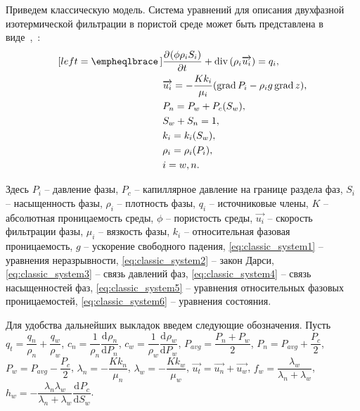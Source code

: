 \newcommand*{\pd}[3][]{\ensuremath{\dfrac{\partial^{#1} #2}{\partial #3^{#1}}}}
\newcommand*{\dd}[3][]{\ensuremath{\dfrac{\mathrm d^{#1} #2}{\mathrm d #3^{#1}}}}
\newcommand{\grad}{\mathop{\mathrm{grad}}\nolimits}
\newcommand{\diver}{\mathop{\mathrm{div}}\nolimits}

Приведем классическую модель. Система уравнений для описания двухфазной изотермической фильтрации в пористой среде
может быть представлена в виде~\cite{Aziz-Settari},~\cite{Basniev}:
\begin{subequations} \label{eq:classic_system}
  \begin{align}[left = \empheqlbrace\,]
    &\pd {(\phi \rho_i S_i)}{t} + \diver{(\rho_i \overrightarrow{u_i})} = q_i, \label{eq:classic_system1} \\
    &\overrightarrow{u_i} = -\frac{K k_i}{\mu_i}(\grad {P_i} - {\rho}_i g \grad {z}), \label{eq:classic_system2} \\
    &P_n = P_w + P_{c}({S}_w), \label{eq:classic_system3} \\
    &S_w + S_n = 1, \label{eq:classic_system4} \\
    &k_i = k_i({S}_w), \label{eq:classic_system5} \\
    &\rho_i = \rho_i(P_i), \label{eq:classic_system6} \\
    &i = w,n \nonumber .
  \end{align}
\end{subequations}

Здесь 
$P_i$ -- давление фазы,
$P_c$ -- капиллярное давление на границе раздела фаз,
$S_i$ -- насыщенность фазы,
${\rho}_i$ -- плотность фазы,
$q_i$ -- источниковые члены,
$K$ -- абсолютная проницаемость среды,
$\phi$ -- пористость среды,
$\overrightarrow{u_i}$ -- скорость фильтрации фазы,
$\mu_i$ -- вязкость фазы,
$k_i$ -- относительная фазовая проницаемость,
$g$ -- ускорение свободного падения,
\eqref{eq:classic_system1} -- уравнения неразрывности,
\eqref{eq:classic_system2} -- закон Дарси,
\eqref{eq:classic_system3} -- связь давлений фаз,
\eqref{eq:classic_system4} -- связь насыщенностей фаз,
\eqref{eq:classic_system5} -- уравнения относительных фазовых проницаемостей,
\eqref{eq:classic_system6} -- уравнения состояния.

Для удобства дальнейших выкладок введем следующие обозначения.
Пусть $q_t = \dfrac{q_n}{\rho_n} + \dfrac{q_w}{\rho_w}$,
$c_n = \dfrac{1}{\rho_n} \dd{\rho_n}{P_n}$,
$c_w = \dfrac{1}{\rho_w} \dd{\rho_w}{P_w}$,
$P_{avg} = \dfrac{P_n + P_w}{2}$,
$P_n = P_{avg} + \dfrac{P_c}{2}$,
$P_w = P_{avg} - \dfrac{P_c}{2}$,
$\lambda_n = -\dfrac{K k_n}{\mu_n}$,
$\lambda_w = -\dfrac{K k_w}{\mu_w}$,
$\overrightarrow{u_t} = \overrightarrow{u_n} + \overrightarrow{u_w}$,
$f_w = \dfrac{\lambda_w}{\lambda_n + \lambda_w}$,
$h_w = - \dfrac{\lambda_n\lambda_w}{\lambda_n + \lambda_w} \dd{P_c}{S_w}$.

